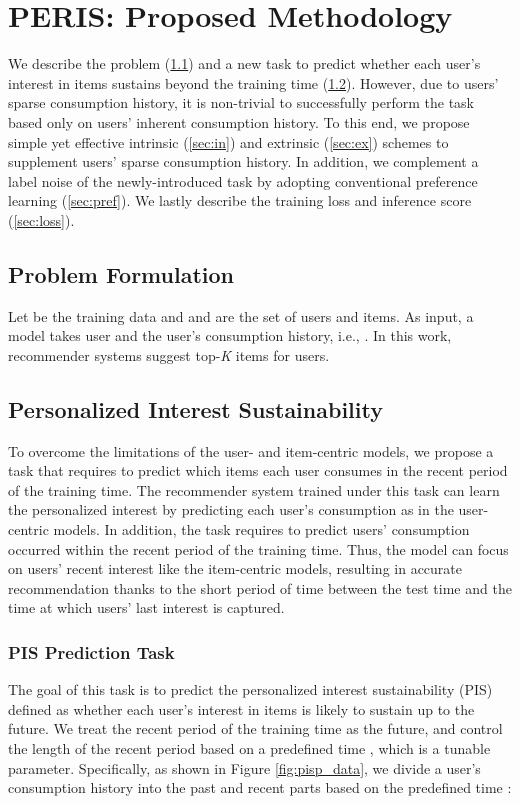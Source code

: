 \documentclass[sigconf]{acmart}
\begin{document}
\section{PERIS: Proposed Methodology}
We describe the problem (\cref{sec:probform}) and a new task to predict whether each user's interest in items sustains beyond the training time (\cref{sec:pis}). However, due to users' sparse consumption history, it is non-trivial to successfully perform the task based only on users' inherent consumption history. To this end, we propose simple yet effective intrinsic (\cref{sec:in}) and extrinsic (\cref{sec:ex}) schemes to supplement users' sparse consumption history. In addition, we complement a label noise of the newly-introduced task by adopting conventional preference learning (\cref{sec:pref}). We lastly describe the training loss and inference score (\cref{sec:loss}). 


\subsection{Problem Formulation}
\label{sec:probform}
Let  be the training data and  and  are the set of users and items.
As input, a model takes user  and the user's consumption history, i.e., . 
In this work, recommender systems suggest top-\textit{K} items for users. 

\subsection{Personalized Interest Sustainability}
\label{sec:pis}

To overcome the limitations of the user- and item-centric models, we propose a task that requires to predict which items each user consumes in the recent period of the training time. The recommender system trained under this task can learn the personalized interest by predicting each user's consumption as in the user-centric models. In addition, the task requires to predict users' consumption occurred within the recent period of the training time. Thus, the model can focus on users' recent interest like the item-centric models, resulting in accurate recommendation thanks to the short period of time between the test time and the time at which users' last interest is captured. 

\subsubsection{\textbf{PIS Prediction Task}}
The goal of this task is to predict the personalized interest sustainability (PIS) defined as whether each user's interest in items is likely to sustain up to the future. 
We treat the recent period of the training time as the future, and control the length of the recent period based on a predefined time , which is a tunable parameter. 
Specifically, as shown in Figure \ref{fig:pisp_data}, we divide a user's consumption history  into the past and recent parts based on the predefined time :
\end{document}
